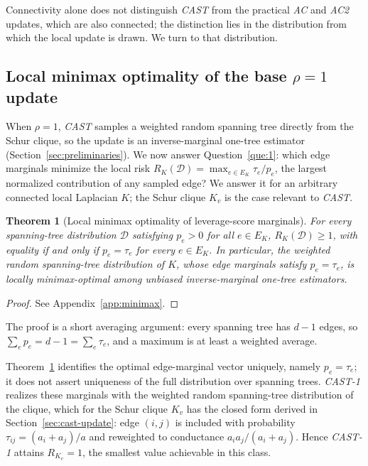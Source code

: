 \documentclass{article}
\newcommand{\CAST}{\textit{CAST}\xspace}
\newcommand{\CASTone}{\textit{CAST-1}\xspace}
\newcommand{\AC}{\textit{AC}\xspace}
\newcommand{\ACtwo}{\textit{AC2}\xspace}
\newcommand{\1}{\mathbbm{1}}
\theoremstyle{plain}
\newtheorem{theorem}{Theorem}[section]
\begin{document}
Connectivity alone does not distinguish \CAST{} from the practical
\AC{} and \ACtwo{} updates, which are also connected; the distinction
lies in the distribution from which the local update is drawn. We turn to that distribution.


\subsection{Local minimax optimality of the base
\texorpdfstring{$\rho=1$}{rho=1} update}
\label{sec:minimax}

When $\rho=1$, \CAST{} samples a weighted random spanning tree
directly from the Schur clique, so the update is an inverse-marginal
one-tree estimator (Section~\ref{sec:preliminaries}). We now answer Question~\ref{que:1}: which edge marginals minimize the
local risk $R_K(\mathcal D)=\max_{e\in E_K}\tau_e/p_e$, the largest
normalized contribution of any sampled edge? We answer it for an
arbitrary connected local Laplacian $K$; the Schur clique $K_v$ is the
case relevant to \CAST{}.


\begin{theorem}[Local minimax optimality of leverage-score marginals]
\label{thm:minimax}
For every spanning-tree distribution $\mathcal{D}$ satisfying
$p_e>0$ for all $e\in E_K$, $R_K(\mathcal{D})\geq 1$, with equality if
and only if $p_e=\tau_e$ for every $e\in E_K$. In particular, the
weighted random spanning-tree distribution of $K$, whose edge
marginals satisfy $p_e=\tau_e$, is locally minimax-optimal among
unbiased inverse-marginal one-tree estimators.
\end{theorem}

\begin{proof}
See Appendix~\ref{app:minimax}.
\end{proof}

The proof is a short averaging argument: every spanning tree has
$d-1$ edges, so $\sum_e p_e=d-1=\sum_e\tau_e$, and a maximum is at
least a weighted average.

Theorem~\ref{thm:minimax} identifies the optimal edge-marginal vector
uniquely, namely $p_e=\tau_e$; it does not assert uniqueness of the
full distribution over spanning trees. \CASTone{} realizes these
marginals with the weighted random spanning-tree distribution of the
clique, which for the Schur clique $K_v$ has the closed form derived
in Section~\ref{sec:cast-update}: edge $(i,j)$ is included with
probability $\tau_{ij}=(a_i+a_j)/a$ and reweighted to conductance
$a_ia_j/(a_i+a_j)$. Hence \CASTone{} attains $R_{K_v}=1$, the smallest
value achievable in this class.
\end{document}
